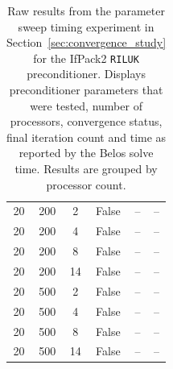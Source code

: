 \begin{table}[H]
\begin{minipage}{0.48\textwidth}
\begin{tabular}{cccccc}
		20            & 200                             & 2                        & False            & --            & --                \\
		20            & 200                             & 4                        & False            & --            & --                \\
		20            & 200                             & 8                        & False            & --            & --                \\
		20            & 200                             & 14                       & False            & --            & --                \\
		20            & 500                             & 2                        & False            & --            & --                \\
		20            & 500                             & 4                        & False            & --            & --                \\
		20            & 500                             & 8                        & False            & --            & --                \\
		20            & 500                             & 14                       & False            & --            & --                \\
		\bottomrule
	\end{tabular}
\end{minipage}
\caption{Raw results from the parameter sweep timing experiment in Section~\ref{sec:convergence_study} for the IfPack2 \texttt{RILUK} preconditioner. Displays preconditioner parameters that were tested, number of processors, convergence status, final iteration count and time as reported by the Belos solve time. Results are grouped by processor count.}
\label{tab:ifpack_results}
\end{table}
\newpage
